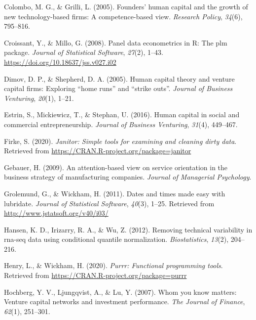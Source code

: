 \documentclass[
  english,
  man]{apa6}
\begin{document}
\leavevmode\hypertarget{ref-colombo2005founders}{}%
Colombo, M. G., \& Grilli, L. (2005). Founders' human capital and the growth of new technology-based firms: A competence-based view. \emph{Research Policy}, \emph{34}(6), 795--816.

\leavevmode\hypertarget{ref-R-plm_a}{}%
Croissant, Y., \& Millo, G. (2008). Panel data econometrics in R: The plm package. \emph{Journal of Statistical Software}, \emph{27}(2), 1--43. \url{https://doi.org/10.18637/jss.v027.i02}

\leavevmode\hypertarget{ref-dimov2005human}{}%
Dimov, D. P., \& Shepherd, D. A. (2005). Human capital theory and venture capital firms: Exploring ``home runs'' and ``strike outs''. \emph{Journal of Business Venturing}, \emph{20}(1), 1--21.

\leavevmode\hypertarget{ref-estrin2016human}{}%
Estrin, S., Mickiewicz, T., \& Stephan, U. (2016). Human capital in social and commercial entrepreneurship. \emph{Journal of Business Venturing}, \emph{31}(4), 449--467.

\leavevmode\hypertarget{ref-R-janitor}{}%
Firke, S. (2020). \emph{Janitor: Simple tools for examining and cleaning dirty data}. Retrieved from \url{https://CRAN.R-project.org/package=janitor}

\leavevmode\hypertarget{ref-gebauer2009attention}{}%
Gebauer, H. (2009). An attention-based view on service orientation in the business strategy of manufacturing companies. \emph{Journal of Managerial Psychology}.

\leavevmode\hypertarget{ref-R-lubridate}{}%
Grolemund, G., \& Wickham, H. (2011). Dates and times made easy with lubridate. \emph{Journal of Statistical Software}, \emph{40}(3), 1--25. Retrieved from \url{http://www.jstatsoft.org/v40/i03/}

\leavevmode\hypertarget{ref-hansen2012removing}{}%
Hansen, K. D., Irizarry, R. A., \& Wu, Z. (2012). Removing technical variability in rna-seq data using conditional quantile normalization. \emph{Biostatistics}, \emph{13}(2), 204--216.

\leavevmode\hypertarget{ref-R-purrr}{}%
Henry, L., \& Wickham, H. (2020). \emph{Purrr: Functional programming tools}. Retrieved from \url{https://CRAN.R-project.org/package=purrr}

\leavevmode\hypertarget{ref-hochberg2007whom}{}%
Hochberg, Y. V., Ljungqvist, A., \& Lu, Y. (2007). Whom you know matters: Venture capital networks and investment performance. \emph{The Journal of Finance}, \emph{62}(1), 251--301.
\end{document}
